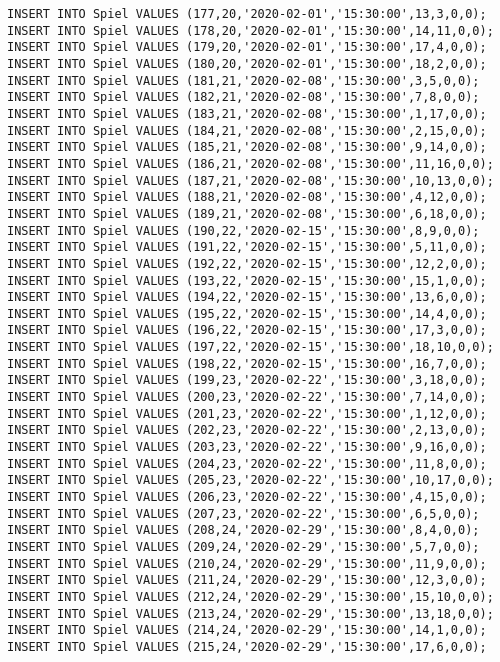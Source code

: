 \documentclass{lehramt-informatik-aufgabe}
\begin{document}
\begin{verbatim}
INSERT INTO Spiel VALUES (177,20,'2020-02-01','15:30:00',13,3,0,0);
INSERT INTO Spiel VALUES (178,20,'2020-02-01','15:30:00',14,11,0,0);
INSERT INTO Spiel VALUES (179,20,'2020-02-01','15:30:00',17,4,0,0);
INSERT INTO Spiel VALUES (180,20,'2020-02-01','15:30:00',18,2,0,0);
INSERT INTO Spiel VALUES (181,21,'2020-02-08','15:30:00',3,5,0,0);
INSERT INTO Spiel VALUES (182,21,'2020-02-08','15:30:00',7,8,0,0);
INSERT INTO Spiel VALUES (183,21,'2020-02-08','15:30:00',1,17,0,0);
INSERT INTO Spiel VALUES (184,21,'2020-02-08','15:30:00',2,15,0,0);
INSERT INTO Spiel VALUES (185,21,'2020-02-08','15:30:00',9,14,0,0);
INSERT INTO Spiel VALUES (186,21,'2020-02-08','15:30:00',11,16,0,0);
INSERT INTO Spiel VALUES (187,21,'2020-02-08','15:30:00',10,13,0,0);
INSERT INTO Spiel VALUES (188,21,'2020-02-08','15:30:00',4,12,0,0);
INSERT INTO Spiel VALUES (189,21,'2020-02-08','15:30:00',6,18,0,0);
INSERT INTO Spiel VALUES (190,22,'2020-02-15','15:30:00',8,9,0,0);
INSERT INTO Spiel VALUES (191,22,'2020-02-15','15:30:00',5,11,0,0);
INSERT INTO Spiel VALUES (192,22,'2020-02-15','15:30:00',12,2,0,0);
INSERT INTO Spiel VALUES (193,22,'2020-02-15','15:30:00',15,1,0,0);
INSERT INTO Spiel VALUES (194,22,'2020-02-15','15:30:00',13,6,0,0);
INSERT INTO Spiel VALUES (195,22,'2020-02-15','15:30:00',14,4,0,0);
INSERT INTO Spiel VALUES (196,22,'2020-02-15','15:30:00',17,3,0,0);
INSERT INTO Spiel VALUES (197,22,'2020-02-15','15:30:00',18,10,0,0);
INSERT INTO Spiel VALUES (198,22,'2020-02-15','15:30:00',16,7,0,0);
INSERT INTO Spiel VALUES (199,23,'2020-02-22','15:30:00',3,18,0,0);
INSERT INTO Spiel VALUES (200,23,'2020-02-22','15:30:00',7,14,0,0);
INSERT INTO Spiel VALUES (201,23,'2020-02-22','15:30:00',1,12,0,0);
INSERT INTO Spiel VALUES (202,23,'2020-02-22','15:30:00',2,13,0,0);
INSERT INTO Spiel VALUES (203,23,'2020-02-22','15:30:00',9,16,0,0);
INSERT INTO Spiel VALUES (204,23,'2020-02-22','15:30:00',11,8,0,0);
INSERT INTO Spiel VALUES (205,23,'2020-02-22','15:30:00',10,17,0,0);
INSERT INTO Spiel VALUES (206,23,'2020-02-22','15:30:00',4,15,0,0);
INSERT INTO Spiel VALUES (207,23,'2020-02-22','15:30:00',6,5,0,0);
INSERT INTO Spiel VALUES (208,24,'2020-02-29','15:30:00',8,4,0,0);
INSERT INTO Spiel VALUES (209,24,'2020-02-29','15:30:00',5,7,0,0);
INSERT INTO Spiel VALUES (210,24,'2020-02-29','15:30:00',11,9,0,0);
INSERT INTO Spiel VALUES (211,24,'2020-02-29','15:30:00',12,3,0,0);
INSERT INTO Spiel VALUES (212,24,'2020-02-29','15:30:00',15,10,0,0);
INSERT INTO Spiel VALUES (213,24,'2020-02-29','15:30:00',13,18,0,0);
INSERT INTO Spiel VALUES (214,24,'2020-02-29','15:30:00',14,1,0,0);
INSERT INTO Spiel VALUES (215,24,'2020-02-29','15:30:00',17,6,0,0);

\end{verbatim}
\end{document}
